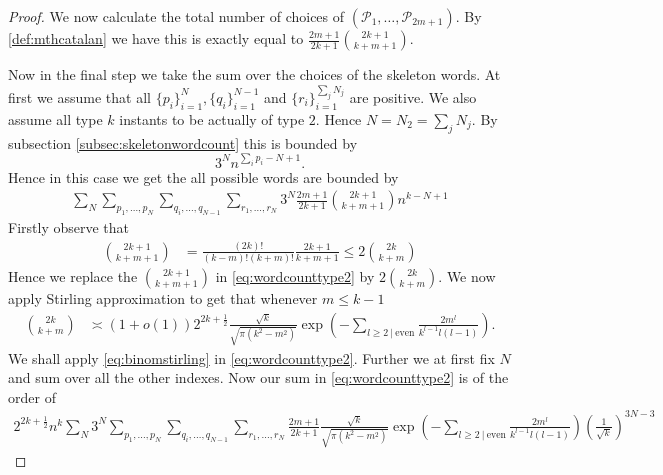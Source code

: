 \documentclass[12pt]{article}
\numberwithin{equation}{section}
\numberwithin{equation}{section}
\theoremstyle{definition}
\renewcommand{\1}{\bf 1}
\begin{document}
\begin{proof}
We now calculate the total number of choices of $\left( \mathcal{P}_{1},\ldots, \mathcal{P}_{2m+1}\right)$. By \eqref{def:mthcatalan} we have this is exactly equal to $\frac{2m+1}{2k+1}\binom{2k+1}{k+m+1}$. 

Now in the final step we take the sum over the choices of the skeleton words. At first we assume that all $\{p_{i}\}_{i=1}^{N}, \{ q_{i} \}_{i=1}^{N-1}$ and $\{ r_{i} \}_{i=1}^{\sum_{j}N_{j}}$ are positive. We also assume all type $k$ instants to be actually of type $2$. Hence $N= N_{2}= \sum_{j}N_{j}$. By subsection \ref{subsec:skeletonwordcount} this is bounded by 
\begin{equation}
3^{N} n^{\sum_{i}p_{i}-N+1}.
\end{equation}
Hence in this case we get the all possible words are bounded by 
 \begin{equation}\label{eq:wordcounttype2}
 \begin{split}
 \sum_{N}\sum_{p_{1},\ldots,p_{N}}\sum_{q_{i},\ldots,q_{N-1}}\sum_{r_{1},\ldots,r_{N}} 3^{N}  \frac{2m+1}{2k+1}\binom{2k+1}{k+m+1} n^{k-N+1}
 \end{split}
 \end{equation}
 Firstly observe that 
 \begin{equation}
 \begin{split}
 \binom{2k+1}{k+m+1} & = \frac{(2k)!}{(k-m)! (k+m)!} \frac{2k+1}{k+m+1} \le 2 \binom{2k}{k+m}
 \end{split}
 \end{equation}
 Hence we replace the $\binom{2k+1}{k+m+1}$ in \eqref{eq:wordcounttype2} by $2 \binom{2k}{k+m}.$ We now apply Stirling approximation to get that whenever $m\le k-1$
 \begin{equation}\label{eq:binomstirling}
 \begin{split}
 \binom{2k}{k+m}&\asymp (1+o(1))2^{2k+\frac{1}{2}}\frac{\sqrt{k}}{\sqrt{\pi(k^2-m^2)}}\exp\left(- \sum_{l\ge 2~|~ \text{even}}\frac{2m^{l}}{k^{l-1}l(l-1)}\right). 
 \end{split}
\end{equation}  
We shall apply \eqref{eq:binomstirling} in \eqref{eq:wordcounttype2}. Further we at first fix $N$ and sum over all the other indexes. Now our sum in \eqref{eq:wordcounttype2} is of the order of  
\begin{equation}\label{eq:wordcountmod}
\begin{split}
2^{2k+\frac{1}{2}}n^{k}\sum_{N}3^{N}\sum_{p_{1},\ldots,p_{N}}\sum_{q_{i},\ldots,q_{N-1}}\sum_{r_{1},\ldots,r_{N}} \frac{2m+1}{2k+1}\frac{\sqrt{k}}{\sqrt{\pi(k^2-m^2)}}\exp\left(- \sum_{l\ge 2~|~ \text{even}}\frac{2m^{l}}{k^{l-1}l(l-1)}\right)\left(\frac{1}{\sqrt{k}}\right)^{3N-3}

\end{split}
\end{equation}
\end{proof}
\end{document}
